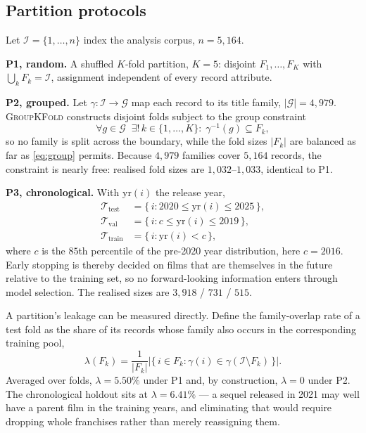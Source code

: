 \documentclass[conference,a4paper]{IEEEtran}
\newcommand{\hlt}[1]{\textbf{#1}}
\begin{document}
\subsection{Partition protocols}
\label{sec:splits}

Let $\mathcal{I} = \{1, \dots, n\}$ index the analysis corpus,
$n = 5{,}164$.

\hlt{P1, random.} A shuffled $K$-fold partition, $K = 5$: disjoint
$F_1, \dots, F_K$ with $\bigcup_k F_k = \mathcal{I}$, assignment
independent of every record attribute.

\hlt{P2, grouped.} Let $\gamma: \mathcal{I} \to \mathcal{G}$ map each
record to its title family, $|\mathcal{G}| = 4{,}979$.
\textsc{GroupKFold} constructs disjoint folds subject to the group
constraint
\begin{equation}
\label{eq:group}
\forall g \in \mathcal{G}\;\; \exists!\, k \in \{1,\dots,K\}:\;
\gamma^{-1}(g) \subseteq F_k ,
\end{equation}
so no family is split across the boundary, while the fold sizes
$|F_k|$ are balanced as far as \eqref{eq:group} permits. Because
$4{,}979$ families cover $5{,}164$ records, the constraint is nearly
free: realised fold sizes are $1{,}032$--$1{,}033$, identical to P1.

\hlt{P3, chronological.} With $\mathrm{yr}(i)$ the release year,
\begin{align}
\mathcal{T}_{\text{test}} &= \{\, i : 2020 \le \mathrm{yr}(i) \le 2025 \,\},\\
\mathcal{T}_{\text{val}}  &= \{\, i : c \le \mathrm{yr}(i) \le 2019 \,\},\\
\mathcal{T}_{\text{train}}&= \{\, i : \mathrm{yr}(i) < c \,\},
\end{align}
where $c$ is the $85$th percentile of the pre-2020 year distribution,
here $c = 2016$. Early stopping is thereby decided on films that are
themselves in the future relative to the training set, so no
forward-looking information enters through model selection. The realised
sizes are $3{,}918$ / $731$ / $515$.

A partition's leakage can be measured directly. Define the family-overlap
rate of a test fold as the share of its records whose family also occurs
in the corresponding training pool,
\begin{equation}
\lambda(F_k) = \frac{1}{|F_k|}
\bigl|\{\, i \in F_k : \gamma(i) \in \gamma(\mathcal{I} \setminus F_k) \,\}\bigr| .
\end{equation}
Averaged over folds, $\lambda = 5.50\%$ under P1 and, by construction,
$\lambda = 0$ under P2. The chronological holdout sits at
$\lambda = 6.41\%$ --- a sequel released in 2021 may well have a parent
film in the training years, and eliminating that would require dropping
whole franchises rather than merely reassigning them.
\end{document}
